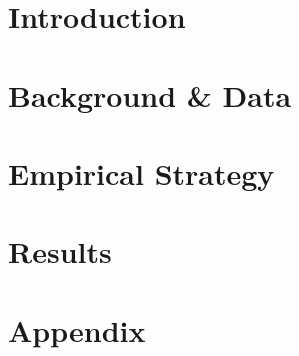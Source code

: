 \documentclass[12pt]{article}
\begin{document}
\doublespacing


\section{Introduction} \label{sec:introduction}






\section{Background \& Data} \label{sec:data}



\section{Empirical Strategy} \label{sec:empirical}



\section{Results} \label{sec:result}





\singlespacing
\setlength\bibsep{0pt}

% 



\clearpage

\appendix
\section*{Appendix} \label{sec:appendix}

\end{document}
